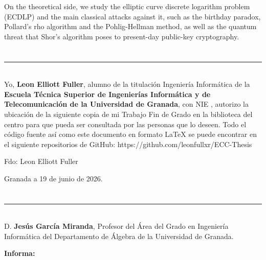 On the theoretical side, we study the elliptic curve discrete logarithm problem (ECDLP) and the main classical attacks against it, such as the birthday paradox, Pollard's rho algorithm and the Pohlig-Hellman method, as well as the quantum threat that Shor's algorithm poses to present-day public-key cryptography.

\chapter*{}
\thispagestyle{empty}

\noindent\rule[-1ex]{\textwidth}{2pt}\\[4.5ex]

Yo, \textbf{Leon Elliott Fuller}, alumno de la titulación Ingeniería Informática de la \textbf{Escuela Técnica Superior
de Ingenierías Informática y de Telecomunicación de la Universidad de Granada}, con NIE \myNIE, autorizo la ubicación de la siguiente copia de mi Trabajo Fin de Grado en la biblioteca del centro para que pueda ser consultada por las personas que lo deseen. Todo el código fuente así como este documento en formato LaTeX se puede encontrar en el siguiente repositorios de GitHub: https://github.com/leonfullxr/ECC-Thesis

\vspace{6cm}

\noindent Fdo: Leon Elliott Fuller

\vspace{2cm}

\begin{flushright}
Granada a 19 de junio de 2026.
\end{flushright}


\chapter*{}
\thispagestyle{empty}

\noindent\rule[-1ex]{\textwidth}{2pt}\\[4.5ex]

D. \textbf{Jesús García Miranda}, Profesor del Área del Grado en Ingeniería Informática  del Departamento de Álgebra de la Universidad de Granada.

\vspace{0.5cm}

\vspace{0.5cm}

\textbf{Informa:}

\vspace{0.5cm}

